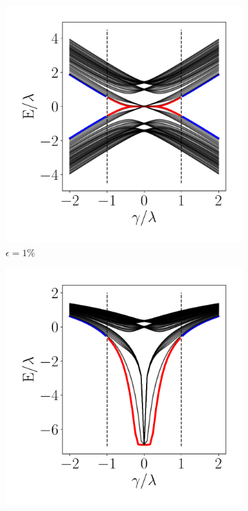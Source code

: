 \begin{figure}[h!]
     \centering
    \captionsetup[sub]{font=small}
     \begin{minipage}[h!]{0.9\textwidth}
         \begin{subfigure}[b!]{0.3 \textwidth}
            \caption{$\epsilon = 1\%$}             \includegraphics[width=\textwidth]{Imagenes/Resultados_Hoti_Fractal/bands_square_shh_0.05.pdf}
         \end{subfigure}\hspace*{-0.5em}
         \begin{subfigure}[b!]{0.3 \textwidth}
             \caption*{}
             \includegraphics[width=\textwidth]{Imagenes/Resultados_Hoti_Fractal/bands_square_shh_log0.05.pdf}

\end{subfigure}
\end{minipage}
\end{figure}
